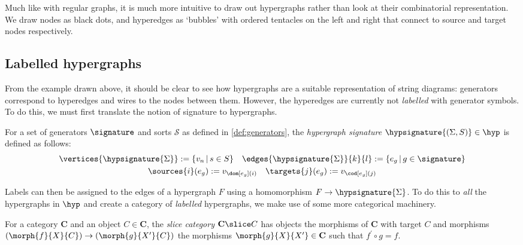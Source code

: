 Much like with regular graphs, it is much more intuitive to draw out hypergraphs
rather than look at their combinatorial representation.
We draw nodes as black dots, and hyperedges as `bubbles' with ordered tentacles
on the left and right that connect to source and target nodes respectively.

\begin{example}
\end{example}

\subsection{Labelled hypergraphs}

From the example drawn above, it should be clear to see how hypergraphs are a
suitable representation of string diagrams: generators correspond to hyperedges
and wires to the nodes between them.
However, the hyperedges are currently not \emph{labelled} with generator
symbols.
To do this, we must first translate the notion of signature to hypergraphs.

\begin{definition}
    For a set of generators \(\signature\) and sorts \(\mathcal{S}\) as defined
    in \cref{def:generators}, the \emph{hypergraph signature}
    \(\hypsignature{(\Sigma, S)} \in \hyp\) is defined as follows:
    \begin{gather*}
        \vertices{\hypsignature{\Sigma}} := \{ v_n \,|\, s \in S\}
        \quad
        \edges{\hypsignature{\Sigma}}{k}{l} := \{ e_g \,|\, g \in \signature\}
        \\
        \sources{i}(e_g) := v_{\dom[e_g](i)}
        \quad
        \targets{j}(e_g) := v_{\cod[e_g](j)}
    \end{gather*}
\end{definition}

\begin{example}
\end{example}

Labels can then be assigned to the edges of a hypergraph \(F\) using a
homomorphism \(F \to \hypsignature{\Sigma}\).
To do this to \emph{all} the hypergraphs in \(\hyp\) and create a category of
\emph{labelled} hypergraphs, we make use of some more categorical machinery.

\begin{definition}
    For a category \(\mathbf{C}\) and an object \(C \in \mathbf{C}\), the
    \emph{slice category} \(\mathbf{C} \slice C\) has objects the morphisms of
    \(\mathbf{C}\) with target \(C\) and morphisms
    \((\morph{f}{X}{C}) \to (\morph{g}{X^\prime}{C})\) the morphisms
    \(\morph{g}{X}{X^\prime} \in \mathbf{C}\) such that \(f^\prime\circ g = f\).
\end{definition}

